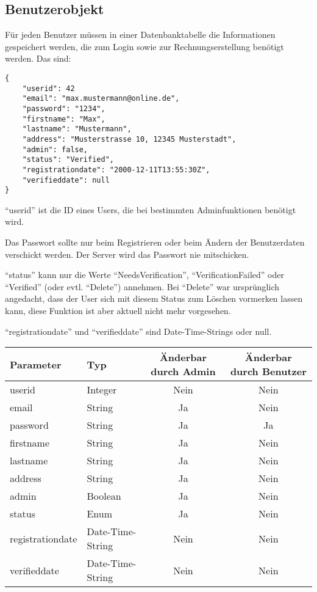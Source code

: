 \documentclass[ngerman,titlepage,parskip=true]{scrartcl}
\begin{document}
	\subsection{Benutzerobjekt}
	\label{benutzerobjekt}
	Für jeden Benutzer müssen in einer Datenbanktabelle die Informationen gespeichert werden, die zum Login sowie zur Rechnungserstellung benötigt werden. 	
	Das sind:
	
\begin{lstlisting}
{
	"userid": 42
	"email": "max.mustermann@online.de",
	"password": "1234",
	"firstname": "Max",
	"lastname": "Mustermann",
	"address": "Musterstrasse 10, 12345 Musterstadt",
	"admin": false,
	"status": "Verified",
	"registrationdate": "2000-12-11T13:55:30Z",
	"verifieddate": null
}
\end{lstlisting}
	
	``userid'' ist die ID eines Users, die bei bestimmten Adminfunktionen benötigt wird.
	
	Das Passwort sollte nur beim Registrieren oder beim Ändern der Benutzerdaten verschickt werden. Der Server wird das Passwort nie mitschicken.
	
	``status'' kann nur die Werte ``NeedsVerification'', ``VerificationFailed'' oder ``Verified'' (oder evtl. ``Delete'') annehmen. Bei ``Delete'' war ursprünglich angedacht, dass der User sich mit diesem Status zum Löschen vormerken lassen kann, diese Funktion ist aber aktuell nicht mehr vorgesehen.
	
	``registrationdate'' und ``verifieddate'' sind Date-Time-Strings oder null. 
	
	\begin{tabular}{|l|l|c|c|}
	\hline
	Parameter 			& Typ 		& Änderbar durch Admin & Änderbar durch Benutzer \\\hline
	userid 				& Integer 	& Nein & Nein \\
	email 				& String 	& Ja   & Nein \\
	password 			& String 	& Ja   & Ja   \\
	firstname 			& String 	& Ja   & Nein \\
	lastname 			& String 	& Ja   & Nein \\
	address 			& String 	& Ja   & Nein \\
	admin 				& Boolean 	& Ja   & Nein \\
	status 				& Enum	 	& Ja   & Nein \\
	registrationdate 	& Date-Time-String 	& Nein & Nein \\
	verifieddate 		& Date-Time-String 	& Nein & Nein \\
	\hline
	\end{tabular}
	
\end{document}
